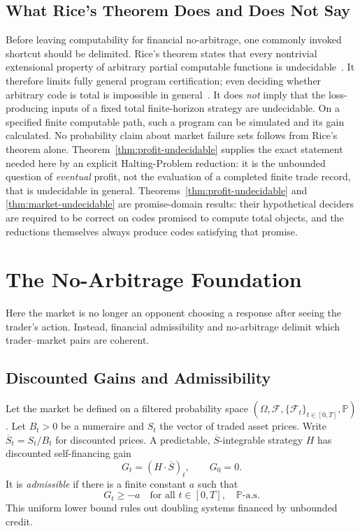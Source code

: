 \documentclass[aps,pra,reprint,superscriptaddress,amsmath,amssymb,floatfix]{revtex4-2}
\theoremstyle{plain}
\theoremstyle{definition}
\theoremstyle{remark}
\begin{document}
\subsection{What Rice's Theorem Does and Does Not Say}

Before leaving computability for financial no-arbitrage, one commonly invoked
shortcut should be delimited.
Rice's theorem states that every nontrivial extensional property of arbitrary
partial computable functions is undecidable~\cite{Rice-1953}. It therefore
limits fully general program certification; even deciding whether arbitrary
code is total is impossible in general~\cite{turing-36}. It does \emph{not}
imply that the loss-producing inputs of a fixed total finite-horizon strategy
are undecidable. On a specified finite computable path, such a program can be
simulated and its gain calculated. No probability claim about market failure
sets follows from Rice's theorem alone. Theorem~\ref{thm:profit-undecidable}
supplies the exact statement needed here by an explicit Halting-Problem
reduction: it is the unbounded question of \emph{eventual} profit, not the
evaluation of a completed finite trade record, that is undecidable in general.
Theorems~\ref{thm:profit-undecidable} and
\ref{thm:market-undecidable} are promise-domain results: their hypothetical
deciders are required to be correct on codes promised to compute total
objects, and the reductions themselves always produce codes satisfying that
promise.

\section{The No-Arbitrage Foundation}
\label{sec:noarb}

Here the market is no longer an opponent choosing a response after seeing the
trader's action. Instead, financial admissibility and no-arbitrage delimit
which trader--market pairs are coherent.

\subsection{Discounted Gains and Admissibility}

Let the market be defined on a filtered probability space
\((\Omega,\mathcal{F},\{\mathcal{F}_t\}_{t\in[0,T]},\mathbb{P})\).
Let \(B_t>0\) be a numeraire and \(S_t\) the vector of traded asset prices.
Write \(\overline S_t=S_t/B_t\) for discounted prices. A predictable,
\(\overline S\)-integrable strategy \(H\) has discounted self-financing gain
\begin{equation}
  G_t=(H\mathbin{\cdot}\overline S)_t,\qquad G_0=0.
  \label{eq:gain}
\end{equation}
It is \emph{admissible} if there is a finite constant \(a\) such that
\begin{equation}
  G_t\geq -a\quad\text{for all }t\in[0,T],\quad\mathbb{P}\text{-a.s.}
  \label{eq:admissible}
\end{equation}
This uniform lower bound rules out doubling systems financed by unbounded
credit.
\end{document}
